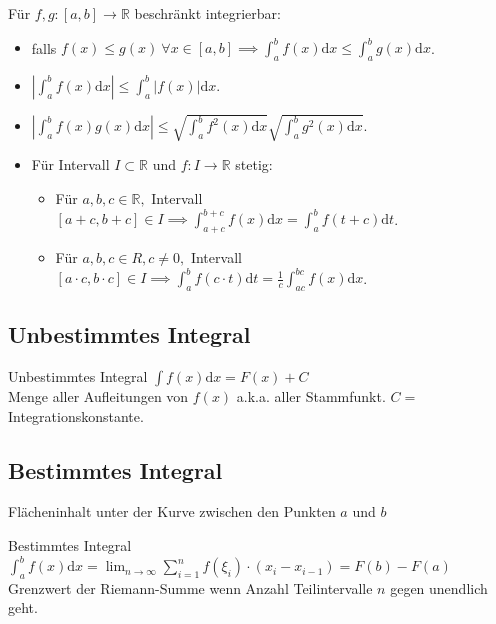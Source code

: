 \documentclass[a4paper]{article}
\def\limn{\lim_{n\to \infty}}
\newcommand\R{\ensuremath{\mathbb{R}}}
\begin{document}
Für $f, g: [a,b] \to \R$ beschränkt integrierbar:
\begin{itemize}[leftmargin=4.5mm, topsep=1pt, parsep=1pt]
    \item falls $f(x) \le g(x) \ \forall x \in [a,b] \implies \int_{a}^{b} f(x) \mathrm{d}x \le \int_{a}^{b} g(x) \mathrm{d}x$.
    \item $\left| \int_{a}^{b} f(x) \mathrm{d}x \right| \le \int_{a}^{b} \left| f(x) \right| \mathrm{d}x$.
    \item $\left| \int_{a}^{b} f(x)g(x) \mathrm{d}x \right| \le \sqrt{\int_{a}^{b} f^2(x) \mathrm{d}x}\sqrt{\int_{a}^{b} g^2(x) \mathrm{d}x}$.
    \item Für Intervall $I \subset \R$ und $f: I \to \R$ stetig:
        \begin{itemize}[leftmargin=4.5mm, topsep=1pt, parsep=1pt]
            \item Für $a,b,c \in \R,$ Intervall $[a+c, b+c] \in I \implies \int_{a+c}^{b+c} f(x) \mathrm{d}x = \int_{a}^{b} f(t + c)\mathrm{d}t$.
            \item Für $a,b,c \in R, c \neq 0,$ Intervall $[a \cdot c, b \cdot c] \in I \implies \int_{a}^{b} f(c \cdot t) \mathrm{d}t = \frac{1}{c} \int_{ac}^{bc} f(x) \mathrm{d}x$.
        \end{itemize}
\end{itemize}

\subsection{Unbestimmtes Integral}
\begin{mainbox}{Unbestimmtes Integral}
  $\int f(x) \mathrm{d}x = F(x) + C$ \\
   \tiny \color{gray}    
       Menge aller Aufleitungen von $f(x)$ a.k.a. aller Stammfunkt. $C = $ Integrationskonstante.
   \normalsize \color{black}
\end{mainbox}


\subsection{Bestimmtes Integral}
Flächeninhalt unter der Kurve zwischen den Punkten $a$ und $b$ \\
\begin{mainbox}{Bestimmtes Integral}
   $\int_{a}^{b} f(x) \mathrm{d}x = \limn \sum_{i=1}^n f(\xi_i) \cdot (x_i - x_{i-1}) = F(b) - F(a)$ \\
   \tiny \color{gray}    
     Grenzwert der Riemann-Summe wenn Anzahl Teilintervalle $n$ gegen unendlich geht.
    \normalsize \color{black}
\end{mainbox}
\end{document}
